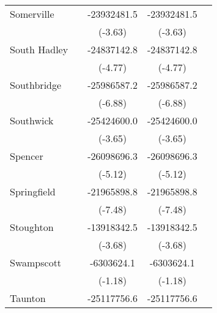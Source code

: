 {\begin{tabular}{l*{4}{c}}
\addlinespace
Somerville          &                     & -23932481.5\sym{***}& -23932481.5\sym{***}&                     \\
                    &                     &     (-3.63)         &     (-3.63)         &                     \\
\addlinespace
South Hadley        &                     & -24837142.8\sym{***}& -24837142.8\sym{***}&                     \\
                    &                     &     (-4.77)         &     (-4.77)         &                     \\
\addlinespace
Southbridge         &                     & -25986587.2\sym{***}& -25986587.2\sym{***}&                     \\
                    &                     &     (-6.88)         &     (-6.88)         &                     \\
\addlinespace
Southwick           &                     & -25424600.0\sym{***}& -25424600.0\sym{***}&                     \\
                    &                     &     (-3.65)         &     (-3.65)         &                     \\
\addlinespace
Spencer             &                     & -26098696.3\sym{***}& -26098696.3\sym{***}&                     \\
                    &                     &     (-5.12)         &     (-5.12)         &                     \\
\addlinespace
Springfield         &                     & -21965898.8\sym{***}& -21965898.8\sym{***}&                     \\
                    &                     &     (-7.48)         &     (-7.48)         &                     \\
\addlinespace
Stoughton           &                     & -13918342.5\sym{***}& -13918342.5\sym{***}&                     \\
                    &                     &     (-3.68)         &     (-3.68)         &                     \\
\addlinespace
Swampscott          &                     &  -6303624.1         &  -6303624.1         &                     \\
                    &                     &     (-1.18)         &     (-1.18)         &                     \\
\addlinespace
Taunton             &                     & -25117756.6\sym{***}& -25117756.6\sym{***}&                     \\

\end{tabular}}
